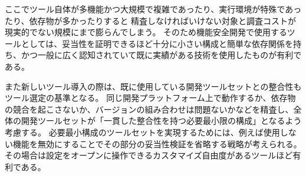 ここでツール自体が多機能かつ大規模で複雑であったり、実行環境が特殊であったり、依存物が多かったりすると
精査しなければいけない対象と調査コストが現実的でない規模にまで膨らんでしまう。
そのため機能安全開発で使用するツールとしては、妥当性を証明できるほど十分に小さい構成と簡単な依存関係を持ち、かつ一般に広く認知されていて既に実績がある技術を使用したものが有利である。
\par
また新しいツール導入の際は、既に使用している開発ツールセットとの整合性もツール選定の基準となる。
同じ開発プラットフォーム上で動作するか、依存物の競合を起こさないか、バージョンの組み合わせは問題ないかなどを精査し、全体の開発ツールセットが「一貫した整合性を持つ必要最小限の構成」となるよう考慮する。
必要最小構成のツールセットを実現するためには、例えば使用しない機能を無効にすることでその部分の妥当性検証を省略する戦略が考えられる。
その場合は設定をオープンに操作できるカスタマイズ自由度があるツールほど有利である。
